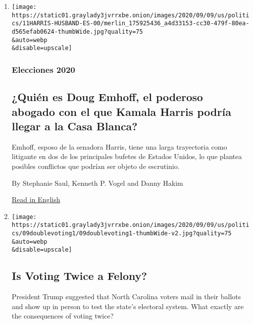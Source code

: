 \begin{enumerate}
\def\labelenumi{\arabic{enumi}.}
\item
  \href{/es/2020/09/11/espanol/doug-emhoff-esposo-kamala-harris.html}{}

  \texttt{[image: https://static01.graylady3jvrrxbe.onion/images/2020/09/09/us/politics/11HARRIS-HUSBAND-ES-00/merlin\_175925436\_a4d33153-cc30-479f-80ea-d565efab0624-thumbWide.jpg?quality=75\\\&auto=webp\\\&disable=upscale]}

  \hypertarget{elecciones-2020}{%
  \subsubsection{Elecciones 2020}\label{elecciones-2020}}

  \hypertarget{quiuxe9n-es-doug-emhoff-el-poderoso-abogado-con-el-que-kamala-harris-podruxeda-llegar-a-la-casa-blanca}{%
  \subsection{¿Quién es Doug Emhoff, el poderoso abogado con el que
  Kamala Harris podría llegar a la Casa
  Blanca?}\label{quiuxe9n-es-doug-emhoff-el-poderoso-abogado-con-el-que-kamala-harris-podruxeda-llegar-a-la-casa-blanca}}

  Emhoff, esposo de la senadora Harris, tiene una larga trayectoria como
  litigante en dos de los principales bufetes de Estados Unidos, lo que
  plantea posibles conflictos que podrían ser objeto de escrutinio.

  By Stephanie Saul, Kenneth P. Vogel and Danny Hakim

  \href{https://www.nytimes3xbfgragh.onion/2020/09/08/us/politics/doug-emhoff-kamala-harris-law.html}{Read
  in English}
\item
  \href{/article/voting-twice.html}{}

  \texttt{[image: https://static01.graylady3jvrrxbe.onion/images/2020/09/09/us/politics/09doublevoting1/09doublevoting1-thumbWide-v2.jpg?quality=75\\\&auto=webp\\\&disable=upscale]}

  \hypertarget{is-voting-twice-a-felony}{%
  \subsection{Is Voting Twice a
  Felony?}\label{is-voting-twice-a-felony}}

  President Trump suggested that North Carolina voters mail in their
  ballots and show up in person to test the state's electoral system.
  What exactly are the consequences of voting twice?


\end{enumerate}

